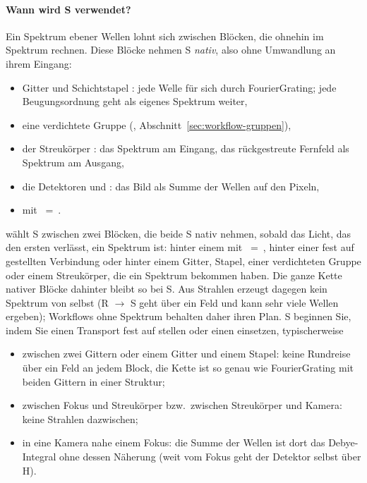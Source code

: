 \paragraph{Wann wird S verwendet?}
Ein Spektrum ebener Wellen lohnt sich zwischen Blöcken, die ohnehin im Spektrum rechnen. Diese
Blöcke nehmen S \emph{nativ}, also ohne Umwandlung an ihrem Eingang:

\begin{itemize}
  \item Gitter  und Schichtstapel : jede Welle für sich durch
        FourierGrating; jede Beugungsordnung geht als eigenes Spektrum weiter,
  \item eine verdichtete Gruppe (,
        Abschnitt~\ref{sec:workflow-gruppen}),
  \item der Streukörper : das Spektrum am Eingang, das rückgestreute
        Fernfeld als Spektrum am Ausgang,
  \item die Detektoren  und : das Bild als Summe der
        Wellen auf den Pixeln,
  \item {} mit ~=~.
\end{itemize}

 wählt S zwischen zwei Blöcken, die beide S nativ nehmen, sobald das Licht, das den
ersten verlässt, ein Spektrum ist: hinter einem  mit ~=~,
hinter einer fest auf  gestellten Verbindung oder hinter einem Gitter, Stapel, einer
verdichteten Gruppe oder einem Streukörper, die ein Spektrum bekommen haben. Die ganze Kette
nativer Blöcke dahinter bleibt so bei S. Aus Strahlen erzeugt  dagegen kein Spektrum
von selbst (R $\to$ S geht über ein Feld und kann sehr viele Wellen ergeben); Workflows ohne
Spektrum behalten daher ihren Plan. S beginnen Sie, indem Sie einen Transport fest auf 
stellen oder einen  einsetzen, typischerweise
\begin{itemize}
  \item zwischen zwei Gittern oder einem Gitter und einem Stapel: keine Rundreise über ein Feld
        an jedem Block, die Kette ist so genau wie FourierGrating mit beiden Gittern in einer
        Struktur;
  \item zwischen Fokus und Streukörper bzw.\ zwischen Streukörper und Kamera: keine Strahlen
        dazwischen;
  \item in eine Kamera nahe einem Fokus: die Summe der Wellen ist dort das Debye-Integral ohne
        dessen Näherung (weit vom Fokus geht der Detektor selbst über H).
\end{itemize}

